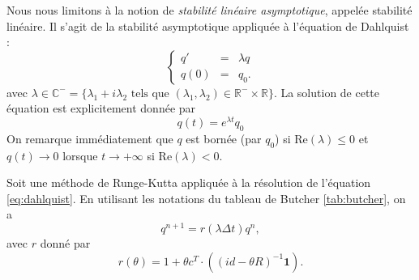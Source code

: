 Nous nous limitons à la notion de \textit{stabilité linéaire asymptotique}, appelée stabilité linéaire. Il s'agit de la stabilité asymptotique appliquée à l'équation de Dahlquist :
\begin{equation}
\left\lbrace 
\begin{array}{rcl}
q' & = & \lambda q \\
q(0) & = & q_0.
\end{array}
\right.
\label{eq:dahlquist}
\end{equation}
avec $\lambda \in \mathbb{C}^- = \{ \lambda_1 + i \lambda_2 \text{ tels que } (\lambda_1, \lambda_2) \in \mathbb{R}^- \times \mathbb{R} \}$. La solution de cette équation est explicitement donnée par 
\begin{equation}
q(t) = e^{\lambda t} q_0
\end{equation}
On remarque immédiatement que $q$ est bornée (par $q_0$) si Re$(\lambda) \leq 0$ et $q(t) \rightarrow 0$ lorsque $t \rightarrow + \infty$ si Re$(\lambda) <0$.

\begin{proposition}
Soit une méthode de Runge-Kutta appliquée à la résolution de l'équation \eqref{eq:dahlquist}. En utilisant les notations du tableau de Butcher \ref{tab:butcher}, on a 
\begin{equation}
q^{n+1} = r(\lambda \Delta t) q^n,
\end{equation}
avec $r$ donné par 
\begin{equation}
r(\theta) = 1 + \theta c^T \cdot \left( (id - \theta R)^{-1} \mathbf{1} \right).
\end{equation}
\end{proposition}


